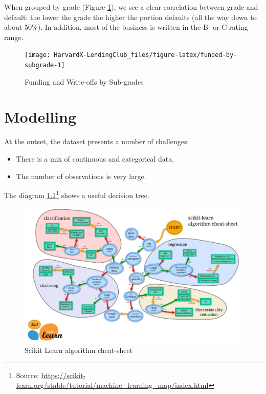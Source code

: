 \documentclass[11pt,]{report}
\let\rmarkdownfootnote\footnote%
\def\footnote{\protect\rmarkdownfootnote}
\begin{document}
\normalsize

When grouped by grade (Figure \ref{fig:funded-by-subgrade}), we see a clear correlation between grade and default: the lower the grade the higher the portion defaults (all the way down to about 50\%). In addition, most of the business is written in the B- or C-rating range.

\small

\begin{figure}

{\centering \texttt{[image: HarvardX-LendingClub\_files/figure-latex/funded-by-subgrade-1]} 

}

\caption{Funding and Write-offs by Sub-grades}\label{fig:funded-by-subgrade}
\end{figure}

\normalsize

\hypertarget{modelling}{%
\chapter{Modelling}\label{modelling}}

At the outset, the dataset presents a number of challenges:

\begin{itemize}
\item
  There is a mix of continuous and categorical data.
\item
  The number of observations is very large.
\end{itemize}

The diagram \ref{fig:scikit-map}\footnote{Source: \url{https://scikit-learn.org/stable/tutorial/machine_learning_map/index.html}} shows a useful decision tree.

\small

\begin{figure}

{\centering \includegraphics[width=0.7\linewidth]{images/scikit-learn-mlmap} 

}

\caption{Scikit Learn algorithm cheat-sheet}\label{fig:scikit-map}
\end{figure}
\end{document}
